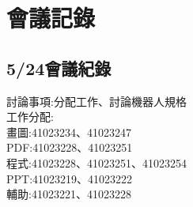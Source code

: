 \chapter{會議記錄}


\section{5/24會議紀錄}


討論事項:分配工作、討論機器人規格\\

工作分配:\\
畫圖:41023234、41023247\\
PDF:41023228、41023251\\
程式:41023228、41023251、41023254\\
PPT:41023219、41023222\\

輔助:41023221、41023228\\


